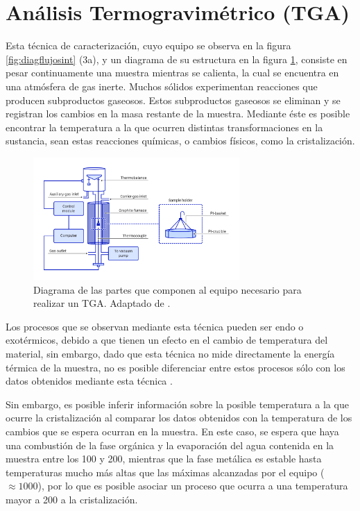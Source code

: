\documentclass[../main.tex]{subfiles}
\begin{document}
\section{Análisis Termogravimétrico (TGA)} \label{sec:metodologiaTGA}
Esta técnica de caracterización, cuyo equipo se observa en la figura \ref{fig:diagflujosint} (3a), y un diagrama de su estructura en la figura \ref{fig:diagTGA}, consiste en pesar continuamente una muestra mientras se calienta, la cual se encuentra en una atmósfera de gas inerte. Muchos sólidos experimentan reacciones que producen subproductos gaseosos. Estos subproductos gaseosos se eliminan y se registran los cambios en la masa restante de la muestra. Mediante éste es posible encontrar la temperatura a la que ocurren distintas transformaciones en la sustancia, sean estas reacciones químicas, o cambios físicos, como la cristalización.
\begin{figure}[H]
    \centering
    \includegraphics[width=0.7\textwidth]{fig/tgadiag.png}
    \caption{Diagrama de las partes que componen al equipo necesario para realizar un TGA. Adaptado de \cite{TGADIAG}.}
    \label{fig:diagTGA}
\end{figure}
Los procesos que se observan mediante esta técnica pueden ser endo o exotérmicos, debido a que tienen un efecto en el cambio de temperatura del material, sin embargo, dado que esta técnica no mide directamente la energía térmica de la muestra, no es posible diferenciar entre estos procesos sólo con los datos obtenidos mediante esta técnica \cite{TGA}.

Sin embargo, es posible inferir información sobre la posible temperatura a la que ocurre la cristalización al comparar los datos obtenidos con la temperatura de los cambios que se espera ocurran en la muestra. En este caso, se espera que haya una combustión de la fase orgánica y la evaporación del agua contenida en la muestra entre los 100 y 200\gradoC{}, mientras que la fase metálica es estable hasta temperaturas mucho más altas que las máximas alcanzadas por el equipo ($\approx1000$\gradoC{}), por lo que es posible asociar un proceso que ocurra a una temperatura mayor a 200\gradoC{} a la cristalización.
\end{document}
